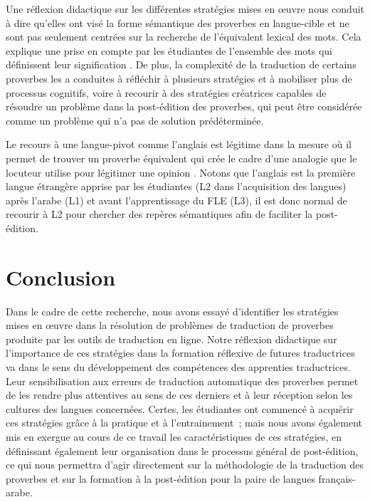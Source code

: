 \documentclass[french]{textolivre}
\begin{document}
Une réflexion didactique sur les différentes stratégies mises en œuvre nous conduit à dire qu’elles ont visé la forme sémantique des proverbes en langue-cible et ne sont pas seulement centrées sur la recherche de l’équivalent lexical des mots. Cela explique une prise en compte par les étudiantes de l’ensemble des mots qui définissent leur signification \cite{elouafa_proverbe_2015}. De plus, la complexité de la traduction de certains proverbes les a conduites à réfléchir à plusieurs stratégies et à mobiliser plus de processus cognitifs, voire à recourir à des stratégies créatrices capables de résoudre un problème \cite[p.~285]{gil-bardaji_resolution_2010} dans la post-édition des proverbes, qui peut être considérée comme un problème qui n’a pas de solution prédéterminée.

Le recours à une langue-pivot comme l’anglais est légitime dans la mesure où il permet de trouver un proverbe équivalent qui crée le cadre d’une analogie que le locuteur utilise pour légitimer une opinion \cite[p.~64]{milica_proverbes_2013}. Notons que l’anglais est la première langue étrangère apprise par les étudiantes (L2 dans l’acquisition des langues) après l’arabe (L1) et avant l’apprentissage du FLE (L3), il est donc normal de recourir à L2 pour chercher des repères sémantiques afin de faciliter la post-édition.

\section{Conclusion}\label{sec-idioma}
Dans le cadre de cette recherche, nous avons essayé d’identifier les stratégies mises en œuvre dans la résolution de problèmes de traduction de proverbes produite par les outils de traduction en ligne. Notre réflexion didactique sur l’importance de ces stratégies dans la formation réflexive de futures traductrices va dans le sens du développement des compétences des apprenties traductrices. Leur sensibilisation aux erreurs de traduction automatique des proverbes permet de les rendre plus attentives au sens de ces derniers et à leur réception selon les cultures des langues concernées. Certes, les étudiantes ont commencé à acquérir ces stratégies grâce à la pratique et à l’entrainement ; mais nous avons également mis en exergue au cours de ce travail les caractéristiques de ces stratégies, en définissant également leur organisation dans le processus général de post-édition, ce qui nous permettra d’agir directement sur la méthodologie de la traduction des proverbes et sur la formation à la post-édition pour la paire de langues français-arabe. 
\end{document}
